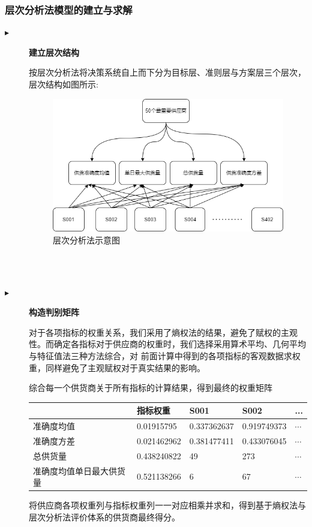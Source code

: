 \documentclass{cumcmthesis}
\begin{document}
\subsubsection*{层次分析法模型的建立与求解}
\begin{description}
\item[$\blacktriangleright$] \textbf{建立层次结构}\par
按层次分析法将决策系统自上而下分为目标层、准则层与方案层三个层次，层次结构如图所示:
\begin{figure}[htbp]
    \centering
    \includegraphics[scale=0.6]{AHP.png}
    \caption{层次分析法示意图}     \label{fig:3}
\end{figure}
\\
\\
\item[$\blacktriangleright$] \textbf{构造判别矩阵}\par
 对于各项指标的权重关系，我们采用了熵权法的结果，避免了赋权的主观性。而确定各指标对于供应商的权重时，我们选择采用算术平均、几何平均与特征值法三种方法综合，对
 前面计算中得到的各项指标的客观数据求权重，同样避免了主观赋权对于真实结果的影响。\par
 综合每一个供货商关于所有指标的计算结果，得到最终的权重矩阵\par
\begin{table}[htbp]
    \begin{tabular}{|l|l|l|l|l|}
    \hline
                 & 指标权重 & S001        & S002        & ... \\
     \hline
    准确度均值        & 0.01915795                   & 0.337362637 & 0.919749373 & $\cdots$ \\
    \hline
    准确度方差        & 0.021462962                  & 0.381477411 & 0.433076045 & $\cdots$ \\
    \hline
    总供货量         & 0.438240822                  & 49          & 273         & $\cdots$ \\
    \hline
    准确度均值单日最大供货量 & 0.521138266                  & 6           & 67          & $\cdots$\\
    \hline
    \end{tabular}
    \end{table}
将供应商各项权重列与指标权重列一一对应相乘并求和，得到基于熵权法与层次分析法评价体系的供货商最终得分。


\end{description}
\end{document}
